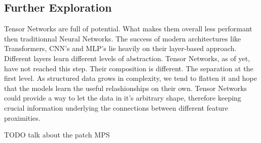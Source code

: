 \documentclass{article}
\theoremstyle{definition}
\theoremstyle{definition}
\begin{document}
\subsection{Further Exploration}
Tensor Networks are full of potential. What makes them overall less performant then traditionnal Neural Networks. The success of modern architectures like Transformers, CNN's and MLP's lie heavily on their layer-based approach. Different layers learn different levels of abstraction. Tensor Networks, as of yet, have not reached this step. Their composition is different. The separation at the first level. As structured data grows in complexity, we tend to flatten it and hope that the models learn the useful relashionships on their own. Tensor Networks could provide a way to let the data in it's arbitrary shape, therefore keeping crucial information underlying the connections between different feature proximities.




TODO talk about the patch MPS

\printbibliography
\end{document}

